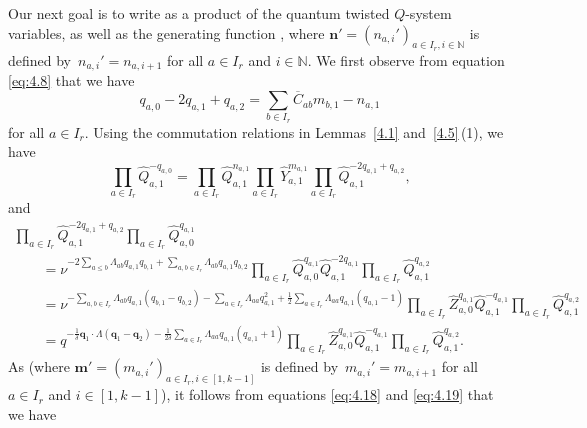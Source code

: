 \documentclass[pdftex]{sigma}
\numberwithin{equation}{section}
\begin{document}
Our next goal is to write  as a product of the quantum twisted $Q$-system variab\-les, as well as the generating function , where $\mathbf{n}'=(n_{a,i}')_{a\in I_r,i\in\mathbb{N}}$ is \mbox{defined} by~${n_{a,i}'=n_{a,i+1}}$ for all $a\in I_r$ and $i\in\mathbb{N}$. We first observe from equation \eqref{eq:4.8} that we have
\begin{equation*}
q_{a,0}-2q_{a,1}+q_{a,2}=\sum_{b\in I_r}\overline{C}_{ab}m_{b,1}-n_{a,1}
\end{equation*}
for all $a\in I_r$. Using the commutation relations in Lemmas~\ref{4.1} and~\ref{4.5}\,(1), we have
\begin{equation}\label{eq:4.18}
\prod_{a\in I_r}\widehat{Q}_{a,1}^{-q_{a,0}}
=\prod_{a\in I_r}\widehat{Q}_{a,1}^{n_{a,1}}\prod_{a\in I_r}\widehat{Y}_{a,1}^{m_{a,1}}\prod_{a\in I_r}\widehat{Q}_{a,1}^{-2q_{a,1}+q_{a,2}},
\end{equation}
and
\begin{gather}
\prod_{a\in I_r}\widehat{Q}_{a,1}^{-2q_{a,1}+q_{a,2}}\prod_{a\in I_r}\widehat{Q}_{a,0}^{q_{a,1}}\nonumber\\
\qquad=\nu^{-2\sum_{a\leq b}\Lambda_{ab}q_{a,1}q_{b,1}+\sum_{a,b\in I_r}\Lambda_{ab}q_{a,1}q_{b,2}}\prod_{a\in I_r}\widehat{Q}_{a,0}^{q_{a,1}}\widehat{Q}_{a,1}^{-2q_{a,1}}\prod_{a\in I_r}\widehat{Q}_{a,1}^{q_{a,2}}\nonumber\\
\qquad=\nu^{-\sum_{a,b\in I_r}\Lambda_{ab}q_{a,1}(q_{b,1}-q_{b,2})-\sum_{a\in I_r}\Lambda_{aa}q_{a,1}^2+\frac{1}{2}\sum_{a\in I_r}\Lambda_{aa}q_{a,1}(q_{a,1}-1)}\prod_{a\in I_r}\widehat{Z}_{a,0}^{q_{a,1}}\widehat{Q}_{a,1}^{-q_{a,1}}\prod_{a\in I_r}\widehat{Q}_{a,1}^{q_{a,2}}\nonumber\\
\qquad=q^{-\frac{1}{\delta}\mathbf{q}_1\cdot\Lambda(\mathbf{q}_1-\mathbf{q}_2)-\frac{1}{2\delta}\sum_{a\in I_r}\Lambda_{aa}q_{a,1}(q_{a,1}+1)}\prod_{a\in I_r}\widehat{Z}_{a,0}^{q_{a,1}}\widehat{Q}_{a,1}^{-q_{a,1}}\prod_{a\in I_r}\widehat{Q}_{a,1}^{q_{a,2}}.\label{eq:4.19}
\end{gather}
As  (where $\mathbf{m}'=(m_{a,i}')_{a\in I_r,i\in[1,k-1]}$ is defined by~${m_{a,i}'= m_{a,i+1}}$ for all $a\in I_r$ and $i\in[1,k-1]$), it follows from equations \eqref{eq:4.18} and \eqref{eq:4.19} that we have
\end{document}
